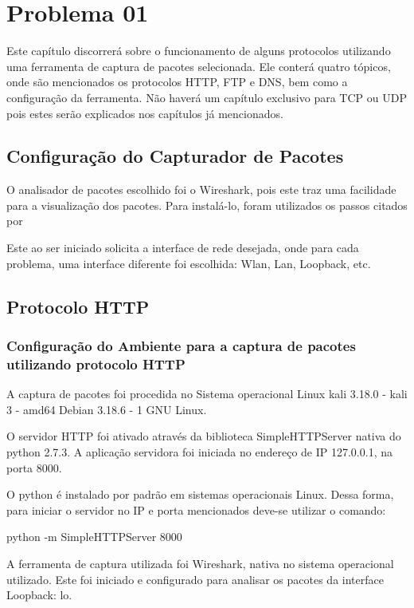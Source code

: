 \chapter[Problema 01]{Problema 01}

Este capítulo discorrerá sobre o funcionamento de alguns protocolos utilizando uma ferramenta
de captura de pacotes selecionada. Ele conterá quatro tópicos, onde são mencionados os protocolos
HTTP, FTP e DNS, bem como a configuração da ferramenta. Não haverá um capítulo exclusivo para
TCP ou UDP pois estes serão explicados nos capítulos já mencionados.

\section{Configuração do Capturador de Pacotes}

O analisador de pacotes escolhido foi o Wireshark, pois este traz uma facilidade para a visualização
dos pacotes.
Para instalá-lo, foram utilizados os passos citados por \cite{instalacaowireshark}

Este ao ser iniciado solicita a interface de rede desejada, onde para cada problema, uma interface diferente
foi escolhida: Wlan, Lan, Loopback, etc.

\section{Protocolo HTTP}

\subsection{Configuração do Ambiente para a captura de pacotes utilizando protocolo HTTP}
A captura de pacotes foi procedida no Sistema operacional Linux kali 3.18.0 - kali 3 - amd64
Debian 3.18.6 - 1 GNU Linux.

O servidor HTTP foi ativado através da biblioteca SimpleHTTPServer nativa do python 2.7.3.
  A aplicação servidora foi iniciada no endereço de IP 127.0.0.1, na porta 8000.

O python é instalado por padrão em sistemas operacionais Linux. Dessa forma, para iniciar o
servidor no IP e porta mencionados deve-se utilizar o comando:

python -m SimpleHTTPServer 8000

A ferramenta de captura utilizada foi Wireshark, nativa no sistema operacional utilizado.
Este foi iniciado e configurado para analisar os pacotes da interface Loopback: lo.


